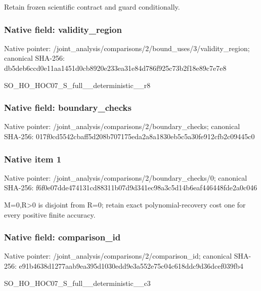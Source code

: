 \documentclass[10pt,a4paper]{article}
\begin{document}
\begingroup\raggedright\sloppy Retain frozen scientific contract and guard conditionally.\par\endgroup

\subsubsection{Native field: validity\_\allowbreak{}region}
Native pointer: /joint\_\allowbreak{}analysis/comparisons/2/bound\_\allowbreak{}uses/3/validity\_\allowbreak{}region; canonical SHA-256: db5deb6ccd0e11aa1451d0cb8920e233ea31e84d786f925c73b2f18e89c7e7e8

\begingroup\raggedright\sloppy SO\_\allowbreak{}HO\_\allowbreak{}HOC07\_\allowbreak{}S\_\allowbreak{}full\_\allowbreak{}\_\allowbreak{}deterministic\_\allowbreak{}\_\allowbreak{}r8\par\endgroup

\subsubsection{Native field: boundary\_\allowbreak{}checks}
Native pointer: /joint\_\allowbreak{}analysis/comparisons/2/boundary\_\allowbreak{}checks; canonical SHA-256: 017f0cd5542cbaff5d208b707175eda2a8a1830eb5c5a30fe912cfb2c09445c0

\subsubsection{Native item 1}
Native pointer: /joint\_\allowbreak{}analysis/comparisons/2/boundary\_\allowbreak{}checks/0; canonical SHA-256: f6f0e07dde474131cd88311b07d9d341ec98a3c5d14b6eaf446448fde2a0c046

\begingroup\raggedright\sloppy M=\allowbreak{}0,\allowbreak{}R>0 is disjoint from R=\allowbreak{}0;\allowbreak{} retain exact polynomial-recovery cost one for every positive finite accuracy.\par\endgroup

\subsubsection{Native field: comparison\_\allowbreak{}id}
Native pointer: /joint\_\allowbreak{}analysis/comparisons/2/comparison\_\allowbreak{}id; canonical SHA-256: e91b4638d1277aab9ea395d1030edd9e3a552e75c04c618ddc9d36dcef039fb4

\begingroup\raggedright\sloppy SO\_\allowbreak{}HO\_\allowbreak{}HOC07\_\allowbreak{}S\_\allowbreak{}full\_\allowbreak{}\_\allowbreak{}deterministic\_\allowbreak{}\_\allowbreak{}c3\par\endgroup
\end{document}
